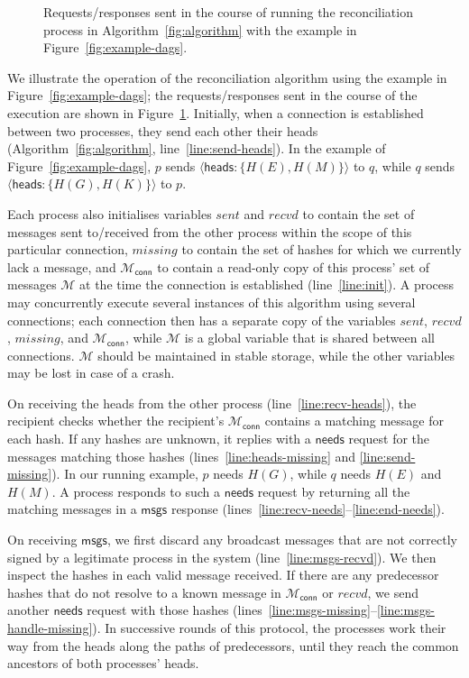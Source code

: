 \documentclass[a4paper,anonymous,USenglish]{lipics-v2019}
\begin{document}
\begin{figure}
    
    \caption{Requests/responses sent in the course of running the reconciliation process in Algorithm~\ref{fig:algorithm} with the example in Figure~\ref{fig:example-dags}.}
    \label{fig:messages}
\end{figure}

We illustrate the operation of the reconciliation algorithm using the example in Figure~\ref{fig:example-dags}; the requests/responses sent in the course of the execution are shown in Figure~\ref{fig:messages}.
Initially, when a connection is established between two processes, they send each other their heads (Algorithm~\ref{fig:algorithm}, line~\ref{line:send-heads}).
In the example of Figure~\ref{fig:example-dags}, $p$ sends $\langle\mathsf{heads}: \{H(E),H(M)\}\rangle$ to $q$, while $q$ sends $\langle\mathsf{heads}: \{H(G),H(K)\}\rangle$ to $p$.

Each process also initialises variables $\mathit{sent}$ and $\mathit{recvd}$ to contain the set of messages sent to/received from the other process within the scope of this particular connection, $\mathit{missing}$ to contain the set of hashes for which we currently lack a message, and $\mathcal{M}_\mathsf{conn}$ to contain a read-only copy of this process' set of messages $\mathcal{M}$ at the time the connection is established (line~\ref{line:init}).
A process may concurrently execute several instances of this algorithm using several connections; each connection then has a separate copy of the variables $\mathit{sent}$, $\mathit{recvd}$, $\mathit{missing}$, and $\mathcal{M}_\mathsf{conn}$, while $\mathcal{M}$ is a global variable that is shared between all connections.
$\mathcal{M}$ should be maintained in stable storage, while the other variables may be lost in case of a crash.

On receiving the heads from the other process (line~\ref{line:recv-heads}), the recipient checks whether the recipient's $\mathcal{M}_\mathsf{conn}$ contains a matching message for each hash.
If any hashes are unknown, it replies with a $\mathsf{needs}$ request for the messages matching those hashes (lines~\ref{line:heads-missing} and \ref{line:send-missing}).
In our running example, $p$ needs $H(G)$, while $q$ needs $H(E)$ and $H(M)$.
A process responds to such a $\mathsf{needs}$ request by returning all the matching messages in a $\mathsf{msgs}$ response (lines~\ref{line:recv-needs}--\ref{line:end-needs}).

On receiving $\mathsf{msgs}$, we first discard any broadcast messages that are not correctly signed by a legitimate process in the system (line~\ref{line:msgs-recvd}).
We then inspect the hashes in each valid message received.
If there are any predecessor hashes that do not resolve to a known message in $\mathcal{M}_\mathsf{conn}$ or $\mathit{recvd}$, we send another $\mathsf{needs}$ request with those hashes (lines~\ref{line:msgs-missing}--\ref{line:msgs-handle-missing}).
In successive rounds of this protocol, the processes work their way from the heads along the paths of predecessors, until they reach the common ancestors of both processes' heads.
\end{document}
